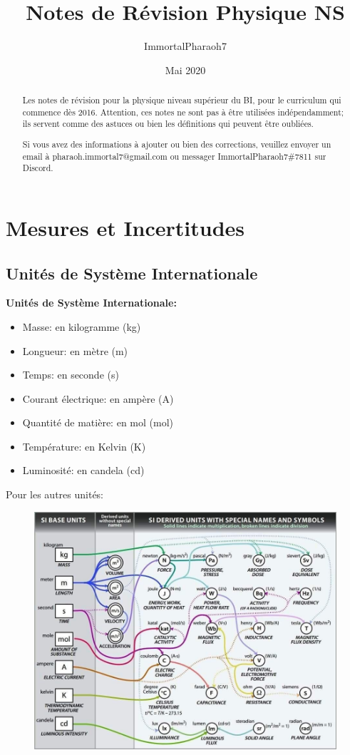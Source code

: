\documentclass[french, a4paper, 12pt]{article}
\author{ImmortalPharaoh7}
\title{Notes de Révision Physique NS}
\date{Mai 2020}
\begin{document}
\begin{titlepage}
\maketitle
\begin{abstract}
Les notes de révision pour la physique niveau supérieur du BI, pour le curriculum qui commence dès 2016. Attention, ces notes ne sont pas à être utilisées indépendamment; ils servent comme des astuces ou bien les définitions qui peuvent être oubliées.

Si vous avez des informations à ajouter ou bien des corrections, veuillez envoyer un email à pharaoh.immortal7@gmail.com ou messager ImmortalPharaoh7\#7811 sur Discord.
\end{abstract}
\end{titlepage}

\tableofcontents
\pagebreak

\section{Mesures et Incertitudes}
\subsection{Unités de Système Internationale}
\textbf{Unités de Système Internationale:}
\begin{itemize}
\item Masse: en kilogramme (kg)
\item Longueur: en mètre (m)
\item Temps: en seconde (s)
\item Courant électrique: en ampère (A)
\item Quantité de matière: en mol (mol)
\item Température: en Kelvin (K)
\item Luminosité: en candela (cd)
\end{itemize}
Pour les autres unités:
\begin{figure}[h]
\centering
\includegraphics[scale=0.4]{units_derivation}
\end{figure}
\end{document}
